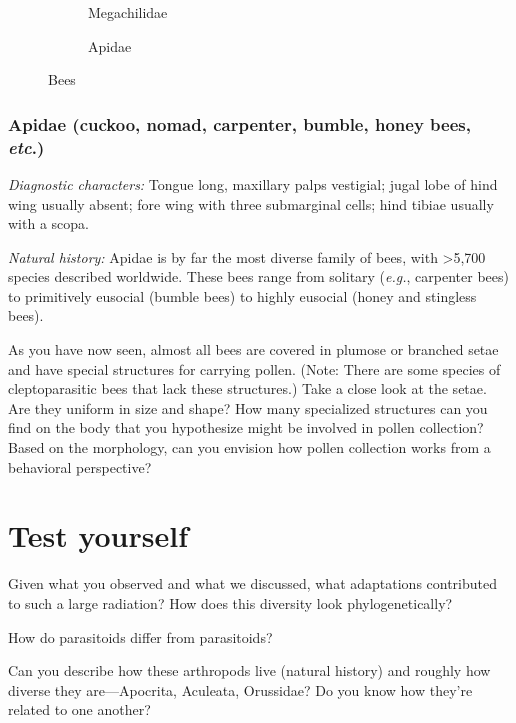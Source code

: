 \begin{figure}[ht!]
    \centering
     \begin{subfigure}[ht!]{0.4\textwidth}
        \caption{Megachilidae}
        \label{fig:megachilid1}
    \end{subfigure}
   \qquad
    \begin{subfigure}[ht!]{0.28\textwidth}
        \caption{Apidae}
        \label{fig:apid1}
    \end{subfigure}
    \caption{Bees \citep[][Figs. 116, 123]{goulet1993hymenoptera}}\label{fig:notused}
\end{figure}

\subsubsection{Apidae (cuckoo, nomad, carpenter, bumble, honey bees, \textit{etc}.)}
\noindent{}\textit{Diagnostic characters:} Tongue long, maxillary palps vestigial; jugal lobe of hind wing usually absent; fore wing with three submarginal cells; hind tibiae usually with a scopa.\vspace{3mm}

\noindent{}\textit{Natural history:} Apidae is by far the most diverse family of bees, with \textgreater5,700 species described worldwide. These bees range from solitary (\textit{e.g.}, carpenter bees) to primitively eusocial (bumble bees) to highly eusocial (honey and stingless bees).\vspace{3mm}

\noindent{}As you have now seen, almost all bees are covered in plumose or branched setae and have special structures for carrying pollen. (Note: There are some species of cleptoparasitic bees that lack these structures.) Take a close look at the setae. Are they uniform in size and shape? How many specialized structures can you find on the body that you hypothesize might be involved in pollen collection? Based on the morphology, can you envision how pollen collection works from a behavioral perspective?\vspace{3mm}

\section*{Test yourself}
Given what you observed and what we discussed, what adaptations contributed to such a large radiation? How does this diversity look phylogenetically?\vspace{5mm}

\noindent{}How do  parasitoids differ from  parasitoids?\vspace{5mm}

\noindent{}Can you describe how these arthropods live (natural history) and roughly how diverse they are---Apocrita, Aculeata, Orussidae? Do you know how they're related to one another? 


\clearpage
\thispagestyle{empty}